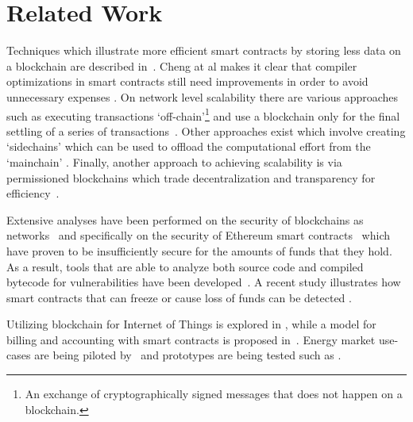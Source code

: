\section{Related Work}
Techniques which illustrate more efficient smart contracts by storing less data on a blockchain are described in~\cite{stateless}. Cheng at al makes it clear that compiler optimizations in smart contracts still need improvements in order to avoid unnecessary expenses \cite{DBLP:journals/corr/ChenLLZ17}. On network level scalability there are various approaches such as executing transactions `off-chain'\footnote{An exchange of cryptographically signed messages that does not happen on a blockchain.} and use a blockchain only for the final settling of a series of transactions~\cite{raiden, funfair, counterfactual}. Other approaches exist which involve creating `sidechains' which can be used to offload the computational effort from the `mainchain' \cite{sidechains, loom, cosmos, plasmacash, plasma}. Finally, another approach to achieving scalability is via permissioned blockchains which trade decentralization and transparency for efficiency~\cite{hyperledger, Vukolic:2017:RPB:3055518.3055526}.

Extensive analyses have been performed on the security of blockchains as networks~\cite{Gervais:2016:SPP:2976749.2978341, cryptoeprint:2018:236} and specifically on the security of Ethereum smart contracts~\cite{Atzei:2017:SAE:3080353.3080363} which have proven to be insufficiently secure for the amounts of funds that they hold. As a result, tools that are able to analyze both source code and compiled bytecode for vulnerabilities have been developed~\cite{Luu:2016:MSC:2976749.2978309, mythril, echidna, smartcheck, securify, zeus}. A recent study \cite{greedyprodigal} illustrates how smart contracts that can freeze or cause loss of funds can be detected \cite{maian}.

Utilizing blockchain for Internet of Things is explored in \cite{iot, integrationiot}, while a model for billing and accounting with smart contracts is proposed in~\cite{billaccount}. Energy market use-cases are being piloted by~\cite{gridplus, powerledger} and prototypes are being tested such as \cite{brooklyn, DBLP:journals/ife/MengelkampNBDW18}.